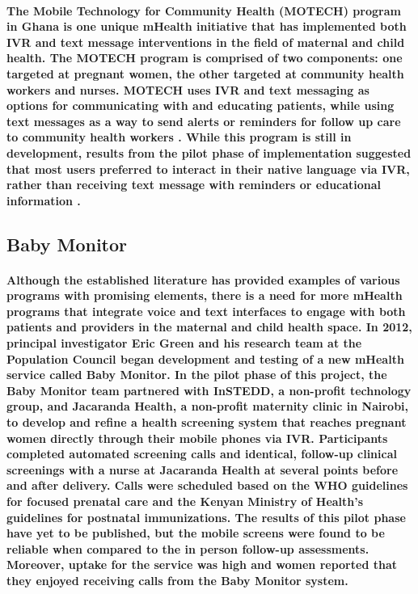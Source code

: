 \paragraph{The Mobile Technology for Community Health (MOTECH) program in Ghana is one unique mHealth initiative that has implemented both IVR and text message interventions in the field of maternal and child health. The MOTECH program is comprised of two components: one targeted at pregnant women, the other targeted at community health workers and nurses. MOTECH uses IVR and text messaging as options for communicating with and educating patients, while using text messages as a way to send alerts or reminders for follow up care to community health workers \citep{MOTECH2011}. While this program is still in development, results from the pilot phase of implementation suggested that most users preferred to interact in their native language via IVR, rather than receiving text message with reminders or educational information \citep{MOTECH2011}.}

\subsection{Baby Monitor}
\paragraph{Although the established literature has provided examples of various programs with promising elements, there is a need for more mHealth programs that integrate voice and text interfaces to engage with both patients and providers in the maternal and child health space. In 2012, principal investigator Eric Green and his research team at the Population Council began development and testing of a new mHealth service called Baby Monitor. In the pilot phase of this project, the Baby Monitor team partnered with InSTEDD, a non-profit technology group, and Jacaranda Health, a non-profit maternity clinic in Nairobi, to develop and refine a health screening system that reaches pregnant women directly through their mobile phones via IVR. Participants completed automated screening calls and identical, follow-up clinical screenings with a nurse at Jacaranda Health at several points before and after delivery. Calls were scheduled based on the WHO guidelines for focused prenatal care and the Kenyan Ministry of Health's guidelines for postnatal immunizations. The results of this pilot phase have yet to be published, but the mobile screens were found to be reliable when compared to the in person follow-up assessments. Moreover, uptake for the service was high and women reported that they enjoyed receiving calls from the Baby Monitor system.}

